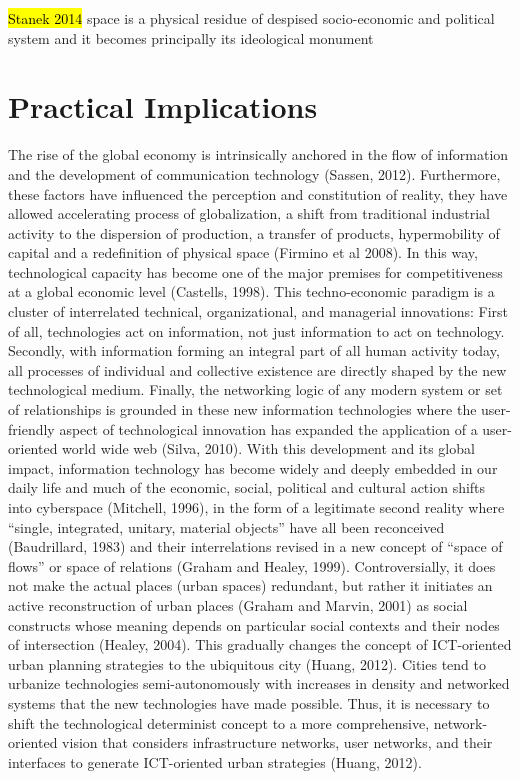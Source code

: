 \documentclass[11pt]{report}
\begin{document}
\hl{Stanek 2014}
space is a physical residue of despised socio-economic and political system and it becomes principally its ideological monument

\section{Practical Implications}

The rise of the global economy is intrinsically anchored in the flow of information and the development of communication technology (Sassen, 2012). Furthermore, these factors have influenced the perception and constitution of reality, they have allowed accelerating process of globalization, a shift from traditional industrial activity to the dispersion of production, a transfer of products, hypermobility of capital and a redefinition of physical space (Firmino et al 2008). In this way, technological capacity has become one of the major premises for competitiveness at a global economic level  (Castells, 1998).
This techno-economic paradigm is a cluster of interrelated technical, organizational, and managerial innovations: First of all, technologies act on information, not just information to act on technology. Secondly, with information forming an integral part of all human activity today, all processes of individual and collective existence are directly shaped by the new technological medium. Finally, the networking logic of any modern system or set of relationships is grounded in these new information technologies where the user-friendly aspect of technological innovation has expanded the application of a user-oriented world wide web (Silva, 2010).
With this development and its global impact, information technology has become widely and deeply embedded in our daily life and much of the economic, social, political and cultural action shifts into cyberspace (Mitchell, 1996), in the form of a legitimate second reality where “single, integrated, unitary, material objects” have all been reconceived (Baudrillard, 1983)  and their interrelations revised in a new concept of “space of flows” or space of relations (Graham and Healey, 1999). Controversially, it does not make the actual places (urban spaces) redundant, but rather it initiates an active reconstruction of urban places (Graham and Marvin, 2001) as social constructs whose meaning depends on particular social contexts and their nodes of intersection (Healey, 2004).  This gradually changes the concept of ICT-oriented urban planning strategies to the ubiquitous city (Huang, 2012).
Cities tend to urbanize technologies semi-autonomously with increases in density and networked systems that the new technologies have made possible. Thus, it is necessary to shift the technological determinist concept to a more comprehensive, network-oriented vision that considers infrastructure networks, user networks, and their interfaces to generate ICT-oriented urban strategies (Huang, 2012).
\end{document}

